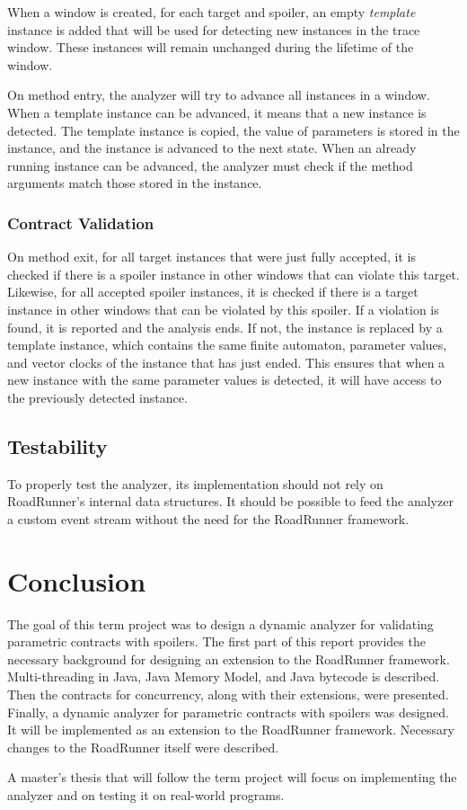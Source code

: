 When a window is created, for each target and spoiler, an empty \emph{template}
instance is added that will be used for detecting new instances in the trace
window. These instances will remain unchanged during the lifetime of the window.

On method entry, the analyzer will try to advance all instances in a window.
When a template instance can be advanced, it means that a new instance is
detected. The template instance is copied, the value of parameters is stored in
the instance, and the instance is advanced to the next state. When an already
running instance can be advanced, the analyzer must check if the method
arguments match those stored in the instance.

\subsection{Contract Validation}

On method exit, for all target instances that were just fully accepted, it is
checked if there is a spoiler instance in other windows that can violate this
target. Likewise, for all accepted spoiler instances, it is checked if there is
a target instance in other windows that can be violated by this spoiler. If a
violation is found, it is reported and the analysis ends. If not, the instance
is replaced by a template instance, which contains the same finite automaton,
parameter values, and vector clocks of the instance that has just ended. This
ensures that when a new instance with the same parameter values is detected, it
will have access to the previously detected instance.


\section{Testability}

To properly test the analyzer, its implementation should not rely on
RoadRunner's internal data structures. It should be possible to feed the
analyzer a custom event stream without the need for the RoadRunner framework.



\chapter{Conclusion}

The goal of this term project was to design a dynamic analyzer for validating
parametric contracts with spoilers. The first part of this report provides the
necessary background for designing an extension to the RoadRunner framework.
Multi-threading in Java, Java Memory Model, and Java bytecode is described.
Then the contracts for concurrency, along with their extensions, were presented.
Finally, a dynamic analyzer for parametric contracts with spoilers was designed.
It will be implemented as an extension to the RoadRunner framework.  Necessary
changes to the RoadRunner itself were described.

A master's thesis that will follow the term project will focus on implementing
the analyzer and on testing it on real-world programs.
